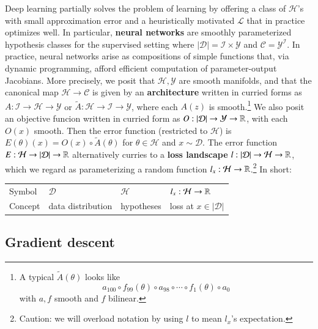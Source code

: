 \documentclass[openany, notitlepage, justified]{tufte-book}
\theoremstyle{plain}
\theoremstyle{definition}
\newcommand{\Cc}{\mathcal{C}}   \newcommand{\CC}{\mathbb{C}}
\newcommand{\Dd}{\mathcal{D}}
\newcommand{\Hh}{\mathcal{H}}
\newcommand{\Ii}{\mathcal{I}}
\newcommand{\Ll}{\mathcal{L}}
\newcommand{\Yy}{\mathcal{Y}}
\begin{document}
        Deep learning partially solves the problem of learning by offering a 
        class of $\Hh$'s with small approximation error and a heuristically
        motivated $\Ll$ that in practice optimizes well.  In particular, 
        \textbf{neural networks} are smoothly parameterized hypothesis classes
        for the supervised setting where $|\Dd| = \Ii\times \Yy$ and $\Cc =
        \Yy^\Ii$.  In practice, neural networks arise as compositions of simple
        functions that, via dynamic programming, afford efficient computation of
        parameter-output Jacobians.  More precisely, we posit that $\Hh, \Yy$
        are smooth manifolds, and that the canonical map $\Hh\to\Cc$ is given
        by an \textbf{architecture} written in curried forms as $A:\Ii\to
        \Hh\to \Yy$ or $\tilde{A}:\Hh\to\Ii\to\Yy$, where each $A(z)$ is
        smooth.\footnote{
            A typical $\tilde{A}(\theta)$ looks like
            $$
                a_{100} \circ f_{99}(\theta) \circ a_{98} \circ
                               \cdots \circ f_1(\theta) \circ a_0 
            $$
            with $a, f$ smooth and $f$ bilinear.
        }
        We also posit an objective funcion written in curried form as
        $O:|\Dd|\to\Yy\to\RR$, with each $O(x)$ smooth.  Then the error
        function (restricted to $\Hh$) is $E(\theta)(x) = O(x)\circ
        \tilde{A}(\theta)$ for $\theta\in \Hh$ and $x\sim \Dd$.  The error
        function $E:\Hh\to |\Dd|\to\RR$ alternatively curries to a \textbf{loss
        landscape} $l:|\Dd|\to\Hh\to\RR$, which we regard as parameterizing a
        random function $l_x: \Hh\to\RR$.\footnote{
            Caution: we will overload notation by using $l$ to mean $l_x$'s 
            expectation.
        }
        In short:
        \begin{table}[h]
            \centering
            \begin{tabular}{l|lll}
                Symbol  &   $\Dd$           &   $\Hh$       &   $l_x:\Hh\to\RR$ \\
                Concept & data distribution & hypotheses    &   loss at $x\in|\Dd|$
            \end{tabular}
        \end{table}

        \newpage
        \subsection{Gradient descent}
\end{document}
